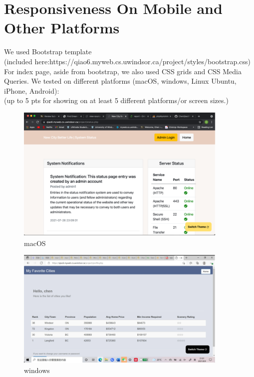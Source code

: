 \documentclass[12pt, letterpaper]{article}
\begin{document}
\section{Responsiveness On Mobile and Other Platforms}

We used Bootstrap template \\(included here:https://qiao6.myweb.cs.uwindsor.ca/project/styles/bootstrap.css) 
\\For index page, aside from bootstrap, we also used CSS grids and CSS Media Queries. 
We tested on different platforms (macOS, windows, Linux Ubuntu, iPhone, Android):
\\(up to 5 pts for showing on at least 5 different platforms/or screen sizes.)

\begin{figure}[htbp]
	\centering
	\includegraphics[width=4in]{images/q12-macOS.png}
	\caption{macOS}
 \end{figure}
 
 \begin{figure}[htbp]
	\centering
	\includegraphics[width=4in]{images/q12-windows.png}
	\caption{windows}
 \end{figure}

 \newpage
 
\end{document}

